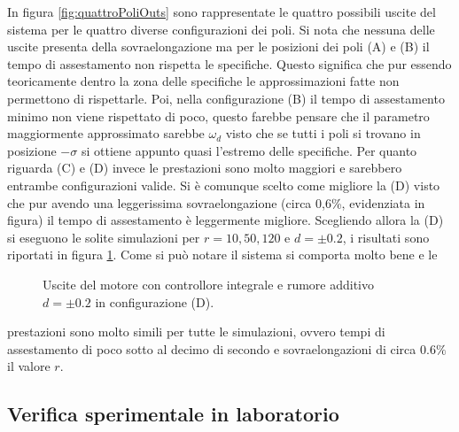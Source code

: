 		\noindent In figura \ref{fig:quattroPoliOuts} sono rappresentate le quattro possibili uscite del sistema per le quattro diverse configurazioni dei poli. Si nota che nessuna delle uscite presenta della sovraelongazione ma per le posizioni dei poli (A) e (B) il tempo di assestamento non rispetta le specifiche. Questo significa che pur essendo teoricamente dentro la zona delle specifiche le approssimazioni fatte non permettono di rispettarle. Poi, nella configurazione (B) il tempo di assestamento minimo non viene rispettato di poco, questo farebbe pensare che il parametro maggiormente approssimato sarebbe $\omega_d$ visto che se tutti i poli si trovano in posizione $-\sigma$ si ottiene appunto quasi l'estremo delle specifiche. Per quanto riguarda (C) e (D) invece le prestazioni sono molto maggiori e sarebbero entrambe configurazioni valide. Si è comunque scelto come migliore la (D) visto che pur avendo una leggerissima sovraelongazione (circa 0,6\%, evidenziata in figura) il tempo di assestamento è leggermente migliore. Scegliendo allora la (D) si eseguono le solite simulazioni per $r=10,50,120$ e $d=\pm0.2$, i risultati  sono riportati in figura \ref{fig:IntegraleDouts}. Come si può notare il sistema si comporta molto bene e le  
		
		\begin{figure}[H]
			\centering
			 
			\caption{Uscite del motore con controllore integrale e rumore additivo $d=\pm 0.2$ in configurazione (D).}
			\label{fig:IntegraleDouts}		
		\end{figure}		
		
		\noindent prestazioni sono molto simili per tutte le simulazioni, ovvero tempi di assestamento di poco sotto al decimo  di secondo e sovraelongazioni di circa $0.6 \%$ il valore $r$.
			
			
			
			
			
			
			
			
			
			
			
			
			
			
			
			
			
			
	
	
	
	
	
	
	
	
	
	
	
	\subsection{Verifica sperimentale in laboratorio}
	\label{subsec:LAB}
		

